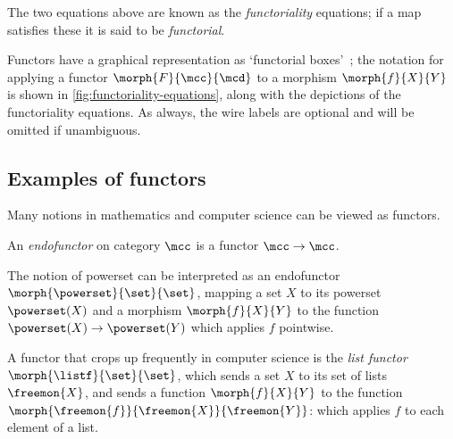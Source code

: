 The two equations above are known as the \emph{functoriality} equations; if a
map satisfies these it is said to be \emph{functorial}.

Functors have a graphical representation as `functorial
boxes'~\cite{mellies2006functorial}; the notation for applying a functor
\(\morph{F}{\mcc}{\mcd}\) to a morphism \(\morph{f}{X}{Y}\) is shown in
\cref{fig:functoriality-equations}, along with the depictions of the
functoriality equations.
As always, the wire labels are optional and will be omitted if unambiguous.



\subsection{Examples of functors}

Many notions in mathematics and computer science can be viewed as functors.

\begin{definition}[Endofunctor]
    An \emph{endofunctor} on category \(\mcc\) is a functor \(\mcc \to \mcc\).
\end{definition}

\begin{example}
    The notion of powerset can be interpreted as an endofunctor \(
    \morph{\powerset}{\set}{\set}
    \), mapping a set \(X\) to its powerset \(\powerset(X)\) and a morphism
    \(\morph{f}{X}{Y}\) to the function \(\powerset(X) \to \powerset(Y)\) which
    applies \(f\) pointwise.
\end{example}

\begin{example}\label{ex:list-functor}
    A functor that crops up frequently in computer science is the
    \emph{list functor} \(\morph{\listf}{\set}{\set}\), which sends a set
    \(X\) to its set of lists \(\freemon{X}\), and sends a function
    \(\morph{f}{X}{Y}\) to the function
    \(\morph{\freemon{f}}{\freemon{X}}{\freemon{Y}}\): which applies \(f\)
    to each element of a list.
\end{example}


